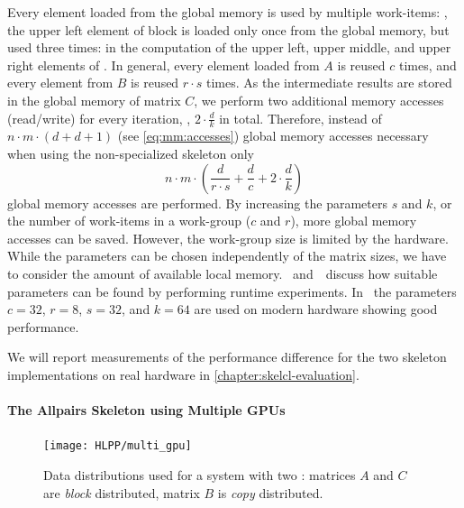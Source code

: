 Every element loaded from the global memory is used by multiple work-items:
\eg, the upper left element of block  is loaded only once from the global memory, but used three times:
in the computation of the upper left, upper middle, and upper right elements of .
In general, every element loaded from $A$ is reused $c$ times, and every element from $B$ is reused $r\cdot s$ times.
As the intermediate results are stored in the global memory of matrix $C$, we perform two additional memory accesses (read/write) for every iteration, \ie, $2\cdot \frac{d}{k}$ in total.
Therefore, instead of $n\cdot m\cdot (d + d + 1)$ (see \autoref{eq:mm:accesses}) global memory accesses necessary when using the non-specialized skeleton only
\begin{equation}
  n\cdot m\cdot (\frac{d}{r\cdot s} + \frac{d}{c} + 2\cdot \frac{d}{k})
\end{equation}
global memory accesses are performed.
By increasing the parameters $s$ and $k$, or the number of work-items in a work-group ($c$ and $r$), more global memory accesses can be saved.
However, the work-group size is limited by the \GPU hardware.
While the parameters can be chosen independently of the matrix sizes, we have to consider the amount of available local memory.
\cite{Friese2013}~and~\cite{SarjeAl2013}~discuss how suitable parameters can be found by performing runtime experiments.
In~\cite{Friese2013} the parameters $c = 32$, $r=8$, $s=32$, and $k=64$ are used on modern \GPU hardware showing good performance.

We will report measurements of the performance difference for the two skeleton implementations on real hardware in \autoref{chapter:skelcl-evaluation}.

\paragraph{The Allpairs Skeleton using Multiple GPUs}
\label{sec:allpairs:multi_gpu}
\begin{figure}[b]
  \centering
  \texttt{[image: HLPP/multi\_gpu]}
  \caption[Data distributions used for the \allpairs skeleton for a system with two \GPUs.]%
          {Data distributions used for a system with two \GPUs: matrices $A$ and $C$ are \emph{block} distributed, matrix $B$ is \emph{copy} distributed.}
  \label{fig:multi_gpu}
\end{figure}

